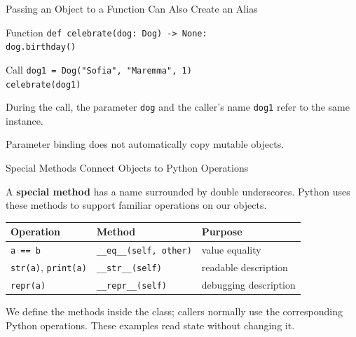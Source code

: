 \documentclass[aspectratio=169,10pt]{beamer}
\begin{document}
\begin{frame}{Passing an Object to a Function Can Also Create an Alias}
  \begin{block}{Function}
    \texttt{def celebrate(dog: Dog) -> None:}\\
    \hspace*{0.20in}\texttt{dog.birthday()}
  \end{block}

  \begin{block}{Call}
    \texttt{dog1 = Dog("Sofia", "Maremma", 1)}\\
    \texttt{celebrate(dog1)}
  \end{block}

  During the call, the parameter \texttt{dog} and the caller's name \texttt{dog1} refer to the same instance.

  \begin{keyidea}
    Parameter binding does not automatically copy mutable objects.
  \end{keyidea}
\end{frame}


\begin{frame}{Special Methods Connect Objects to Python Operations}
  \begin{cpdefinition}
    A \textbf{special method} has a name surrounded by double underscores. Python uses these methods to support familiar operations on our objects.
  \end{cpdefinition}
  \begin{center}
    \renewcommand{\arraystretch}{1.35}
    \begin{tabular}{l|l|l}
      \textbf{Operation} & \textbf{Method} & \textbf{Purpose} \\\hline
      \texttt{a == b} & \texttt{\_\_eq\_\_(self, other)} & value equality \\
      \texttt{str(a)}, \texttt{print(a)} & \texttt{\_\_str\_\_(self)} & readable description \\
      \texttt{repr(a)} & \texttt{\_\_repr\_\_(self)} & debugging description
    \end{tabular}
  \end{center}
  \begin{keyidea}
    We define the methods inside the class; callers normally use the corresponding Python operations. These examples read state without changing it.
  \end{keyidea}
\end{frame}
\end{document}
